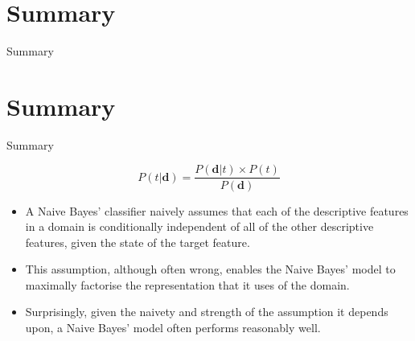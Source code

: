 \documentclass[xcolor={table}]{beamer}
\newcommand{\SectionSlide}[2][]{
	\ifthenelse{\isempty{#1}}
		{\section{#2}\begin{frame} \begin{center}\begin{huge}#2\end{huge}\end{center}\end{frame}}
		{\section[#1]{#2}\begin{frame} \begin{center}\begin{huge}#2\end{huge}\end{center}\end{frame}}
}
\begin{document}
\SectionSlide{Summary}

 \begin{frame} 
 \begin{equation}
	P(t|\mathbf{d})=\frac{P(\mathbf{d}|t) \times P(t)}{P(\mathbf{d})}
\end{equation}
\begin{itemize}
\item A Naive Bayes' classifier naively assumes that each of the descriptive features in a domain is conditionally independent of all of the other descriptive features, given the state of the target feature. 
\item This assumption, although often wrong, enables the Naive Bayes' model to maximally factorise the representation that it uses of the domain. 
\item Surprisingly, given the naivety and strength of the assumption it depends upon, a Naive Bayes' model often performs reasonably well. 
\end{itemize}
\end{frame} 



\begin{frame}
	\tableofcontents
\end{frame}
\end{document}
